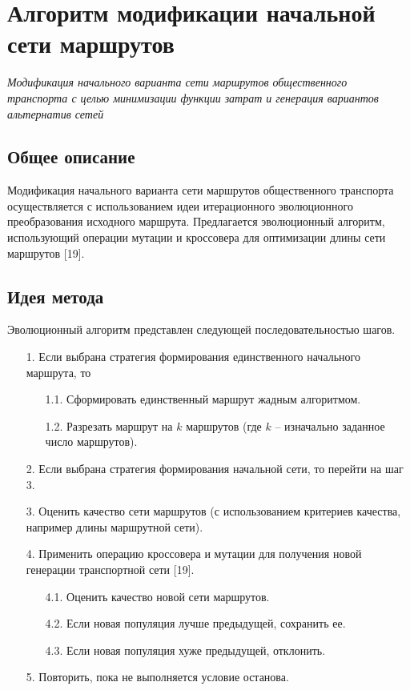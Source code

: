 
\section{Алгоритм модификации начальной сети маршрутов}
\emph{Модификация начального варианта сети маршрутов общественного транспорта с целью минимизации функции 
затрат и генерация вариантов альтернатив сетей}
\subsection{Общее описание}
Модификация начального варианта сети маршрутов общественного транспорта осуществляется с использованием идеи 
итерационного эволюционного преобразования исходного маршрута. Предлагается эволюционный алгоритм, 
использующий операции мутации и кроссовера для оптимизации длины сети маршрутов [19].

\subsection{Идея метода}
Эволюционный алгоритм представлен следующей последовательностью шагов. 
\begin{enumerate}
    \item[1.] Если выбрана стратегия формирования единственного начального маршрута, то 
    \begin{enumerate}
        \item[1.1.] Сформировать единственный маршрут жадным алгоритмом.
        \item[1.2.] Разрезать маршрут на \( k \) маршрутов (где \( k \) -- изначально заданное число 
            маршрутов).
    \end{enumerate}
    \item[2.] Если выбрана стратегия формирования начальной сети, то перейти на шаг 3.
    \item[3.] Оценить качество сети маршрутов (с использованием критериев качества, например длины 
        маршрутной сети).
    \item[4.] Применить операцию кроссовера и мутации для получения новой генерации транспортной сети [19].
    \begin{enumerate}
        \item[4.1.] Оценить качество новой сети маршрутов.
        \item[4.2.] Если новая популяция лучше предыдущей, сохранить ее.
        \item[4.3.] Если новая популяция хуже предыдущей, отклонить. 
    \end{enumerate}
    \item[5.] Повторить, пока не выполняется условие останова.
\end{enumerate}

